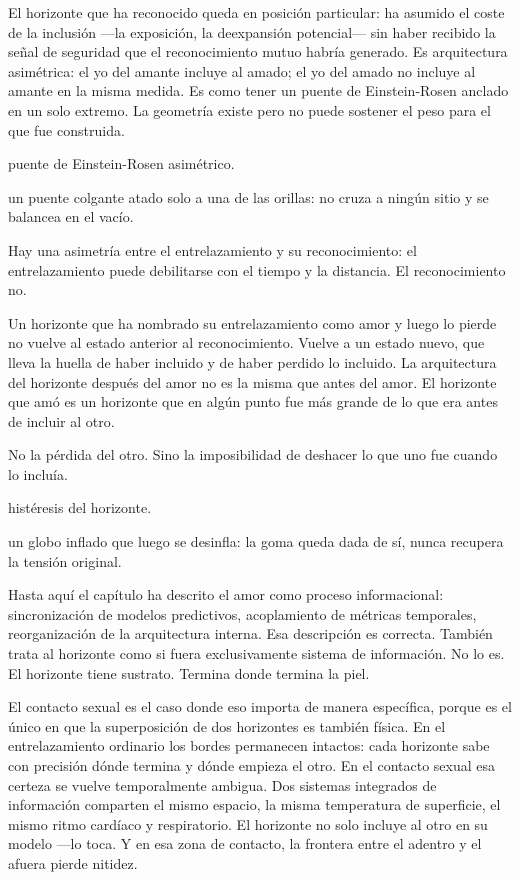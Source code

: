 El horizonte que ha reconocido queda en posición particular: ha asumido el coste de la inclusión —la exposición, la deexpansión potencial— sin haber recibido la señal de seguridad que el reconocimiento mutuo habría generado. Es arquitectura asimétrica: el yo del amante incluye al amado; el yo del amado no incluye al amante en la misma medida. Es como tener un puente de Einstein-Rosen anclado en un solo extremo. La geometría existe pero no puede sostener el peso para el que fue construida.

\begin{fisica}
 puente de Einstein-Rosen asimétrico.

 un puente colgante atado solo a una de las orillas: no cruza a ningún sitio y se balancea en el vacío.
\end{fisica}
\noindent Hay una asimetría entre el entrelazamiento y su reconocimiento: el entrelazamiento puede debilitarse con el tiempo y la distancia. El reconocimiento no.

Un horizonte que ha nombrado su entrelazamiento como amor y luego lo pierde no vuelve al estado anterior al reconocimiento. Vuelve a un estado nuevo, que lleva la huella de haber incluido y de haber perdido lo incluido. La arquitectura del horizonte después del amor no es la misma que antes del amor. El horizonte que amó es un horizonte que en algún punto fue más grande de lo que era antes de incluir al otro.

No la pérdida del otro. Sino la imposibilidad de deshacer lo que uno fue cuando lo incluía.

\begin{fisica}
 histéresis del horizonte.

 un globo inflado que luego se desinfla: la goma queda dada de sí, nunca recupera la tensión original.
\end{fisica}
\noindent Hasta aquí el capítulo ha descrito el amor como proceso informacional: sincronización de modelos predictivos, acoplamiento de métricas temporales, reorganización de la arquitectura interna. Esa descripción es correcta. También trata al horizonte como si fuera exclusivamente sistema de información. No lo es. El horizonte tiene sustrato. Termina donde termina la piel.

El contacto sexual es el caso donde eso importa de manera específica, porque es el único en que la superposición de dos horizontes es también física. En el entrelazamiento ordinario los bordes permanecen intactos: cada horizonte sabe con precisión dónde termina y dónde empieza el otro. En el contacto sexual esa certeza se vuelve temporalmente ambigua. Dos sistemas integrados de información comparten el mismo espacio, la misma temperatura de superficie, el mismo ritmo cardíaco y respiratorio. El horizonte no solo incluye al otro en su modelo —lo toca. Y en esa zona de contacto, la frontera entre el adentro y el afuera pierde nitidez.

